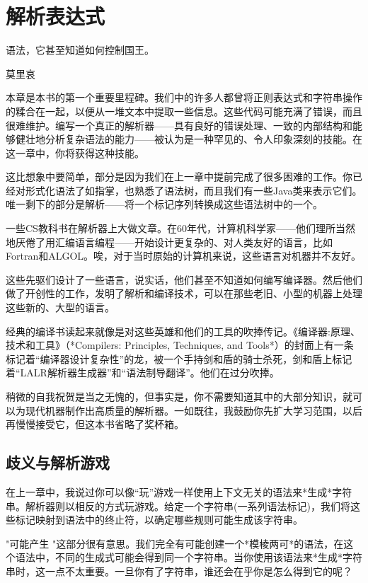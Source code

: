 \documentclass[cn,11pt,chinese]{elegantbook}
\begin{document}
\chapter{解析表达式}

\epigraph{语法，它甚至知道如何控制国王。}{莫里哀}

本章是本书的第一个重要里程碑。我们中的许多人都曾将正则表达式和字符串操作的糅合在一起，以便从一堆文本中提取一些信息。这些代码可能充满了错误，而且很难维护。编写一个真正的解析器——具有良好的错误处理、一致的内部结构和能够健壮地分析复杂语法的能力——被认为是一种罕见的、令人印象深刻的技能。在这一章中，你将获得这种技能。

这比想象中要简单，部分是因为我们在上一章中提前完成了很多困难的工作。你已经对形式化语法了如指掌，也熟悉了语法树，而且我们有一些Java类来表示它们。唯一剩下的部分是解析——将一个标记序列转换成这些语法树中的一个。

一些CS教科书在解析器上大做文章。在60年代，计算机科学家——他们理所当然地厌倦了用汇编语言编程——开始设计更复杂的、对人类友好的语言，比如Fortran和ALGOL。唉，对于当时原始的计算机来说，这些语言对机器并不友好。

这些先驱们设计了一些语言，说实话，他们甚至不知道如何编写编译器。然后他们做了开创性的工作，发明了解析和编译技术，可以在那些老旧、小型的机器上处理这些新的、大型的语言。

经典的编译书读起来就像是对这些英雄和他们的工具的吹捧传记。《编译器:原理、技术和工具》（*Compilers: Principles, Techniques, and Tools*）的封面上有一条标记着“编译器设计复杂性”的龙，被一个手持剑和盾的骑士杀死，剑和盾上标记着“LALR解析器生成器”和“语法制导翻译”。他们在过分吹捧。

稍微的自我祝贺是当之无愧的，但事实是，你不需要知道其中的大部分知识，就可以为现代机器制作出高质量的解析器。一如既往，我鼓励你先扩大学习范围，以后再慢慢接受它，但这本书省略了奖杯箱。

\section{歧义与解析游戏}

在上一章中，我说过你可以像“玩”游戏一样使用上下文无关的语法来*生成*字符串。解析器则以相反的方式玩游戏。给定一个字符串(一系列语法标记)，我们将这些标记映射到语法中的终止符，以确定哪些规则可能生成该字符串。

"可能产生 "这部分很有意思。我们完全有可能创建一个*模棱两可*的语法，在这个语法中，不同的生成式可能会得到同一个字符串。当你使用该语法来*生成*字符串时，这一点不太重要。一旦你有了字符串，谁还会在乎你是怎么得到它的呢？
\end{document}
